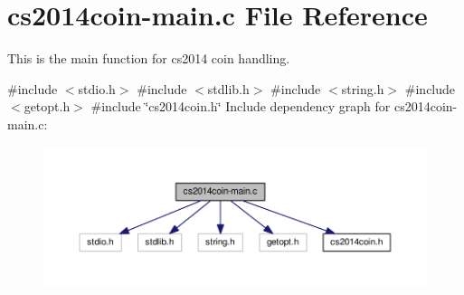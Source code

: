 \hypertarget{cs2014coin-main_8c}{}\section{cs2014coin-\/main.c File Reference}
\label{cs2014coin-main_8c}


This is the main function for cs2014 coin handling.  


{\ttfamily \#include $<$stdio.\+h$>$}\newline
{\ttfamily \#include $<$stdlib.\+h$>$}\newline
{\ttfamily \#include $<$string.\+h$>$}\newline
{\ttfamily \#include $<$getopt.\+h$>$}\newline
{\ttfamily \#include \char`\"{}cs2014coin.\+h\char`\"{}}\newline
Include dependency graph for cs2014coin-\/main.c\+:\nopagebreak
\begin{figure}[H]
\begin{center}
\leavevmode
\includegraphics[width=350pt]{cs2014coin-main_8c__incl}
\end{center}
\end{figure}
